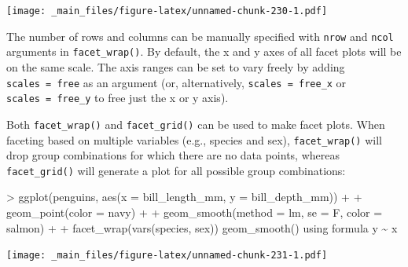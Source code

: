 \documentclass[
]{book}
\newenvironment{Shaded}{\begin{snugshade}}{\end{snugshade}}
\newcommand{\AttributeTok}[1]{\textcolor[rgb]{0.77,0.63,0.00}{#1}}
\newcommand{\FunctionTok}[1]{\textcolor[rgb]{0.00,0.00,0.00}{#1}}
\newcommand{\NormalTok}[1]{#1}
\newcommand{\SpecialCharTok}[1]{\textcolor[rgb]{0.00,0.00,0.00}{#1}}
\newcommand{\StringTok}[1]{\textcolor[rgb]{0.31,0.60,0.02}{#1}}
\begin{document}
\texttt{[image: \_main\_files/figure-latex/unnamed-chunk-230-1.pdf]}

The number of rows and columns can be manually specified with \texttt{nrow} and \texttt{ncol} arguments in \texttt{facet\_wrap()}. By default, the x and y axes of all facet plots will be on the same scale. The axis ranges can be set to vary freely by adding \texttt{scales\ =\ \textquotesingle{}free\textquotesingle{}} as an argument (or, alternatively, \texttt{scales\ =\ \textquotesingle{}free\_x\textquotesingle{}} or \texttt{scales\ =\ \textquotesingle{}free\_y\textquotesingle{}} to free just the x or y axis).

Both \texttt{facet\_wrap()} and \texttt{facet\_grid()} can be used to make facet plots. When faceting based on multiple variables (e.g., species and sex), \texttt{facet\_wrap()} will drop group combinations for which there are no data points, whereas \texttt{facet\_grid()} will generate a plot for all possible group combinations:

\begin{Shaded}
\begin{Highlighting}[]
\SpecialCharTok{\textgreater{}} \FunctionTok{ggplot}\NormalTok{(penguins, }\FunctionTok{aes}\NormalTok{(}\AttributeTok{x =}\NormalTok{ bill\_length\_mm, }\AttributeTok{y =}\NormalTok{ bill\_depth\_mm)) }\SpecialCharTok{+}
\SpecialCharTok{+}   \FunctionTok{geom\_point}\NormalTok{(}\AttributeTok{color =} \StringTok{\textquotesingle{}navy\textquotesingle{}}\NormalTok{) }\SpecialCharTok{+}
\SpecialCharTok{+}   \FunctionTok{geom\_smooth}\NormalTok{(}\AttributeTok{method =} \StringTok{\textquotesingle{}lm\textquotesingle{}}\NormalTok{, }\AttributeTok{se =}\NormalTok{ F, }\AttributeTok{color =} \StringTok{\textquotesingle{}salmon\textquotesingle{}}\NormalTok{) }\SpecialCharTok{+}
\SpecialCharTok{+}   \FunctionTok{facet\_wrap}\NormalTok{(}\FunctionTok{vars}\NormalTok{(species, sex))}
\StringTok{\textasciigrave{}}\AttributeTok{geom\_smooth()}\StringTok{\textasciigrave{}}\NormalTok{ using formula }\StringTok{\textquotesingle{}y \textasciitilde{} x\textquotesingle{}}
\end{Highlighting}
\end{Shaded}

\texttt{[image: \_main\_files/figure-latex/unnamed-chunk-231-1.pdf]}
\end{document}
